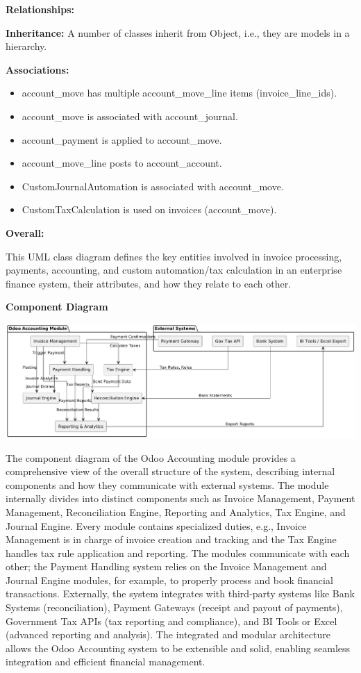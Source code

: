 \documentclass[11pt,a4paper]{article}
\begin{document}
\noindent\textbf{Relationships:}

\noindent\textbf{Inheritance:} A number of classes inherit from Object, i.e., they are models in a hierarchy.

\noindent\textbf{Associations:}
\begin{itemize}
    \item account\_move has multiple account\_move\_line items (invoice\_line\_ids).
    \item account\_move is associated with account\_journal.
    \item account\_payment is applied to account\_move.
    \item account\_move\_line posts to account\_account.
    \item CustomJournalAutomation is associated with account\_move.
    \item CustomTaxCalculation is used on invoices (account\_move).
\end{itemize}
\medskip

\noindent\textbf{Overall:}

This UML class diagram defines the key entities involved in invoice processing, payments, accounting, and custom automation/tax calculation in an enterprise finance system, their attributes, and how they relate to each other.
\bigskip

\noindent\textbf{Component Diagram}
\begin{center}
    \includegraphics[width=\linewidth]{diagram/component_diagram.png}
\end{center}

\noindent The component diagram of the Odoo Accounting module provides a comprehensive view of the overall structure of the system, describing internal components and how they communicate with external systems. The module internally divides into distinct components such as Invoice Management, Payment Management, Reconciliation Engine, Reporting and Analytics, Tax Engine, and Journal Engine. Every module contains specialized duties, e.g., Invoice Management is in charge of invoice creation and tracking and the Tax Engine handles tax rule application and reporting. The modules communicate with each other; the Payment Handling system relies on the Invoice Management and Journal Engine modules, for example, to properly 
process and book financial transactions. Externally, the system integrates with third-party 
systems like Bank Systems (reconciliation), Payment Gateways (receipt and payout of 
payments), Government Tax APIs (tax reporting and compliance), and BI Tools or Excel 
(advanced reporting and analysis). The integrated and modular architecture allows the Odoo 
Accounting system to be extensible and solid, enabling seamless integration and efficient 
financial management.
\bigskip
\end{document}
